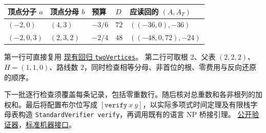 \documentclass[UTF8,fontset=fandol,11pt,a4paper]{ctexart}
\newcommand{\src}[2]{\href{https://github.com/huam54925-cpu/uav-routing-certification/blob/b083efc56ecf5b4f96f2e5b06134d1ed05806351/LeanCompletion/UAV/#1.lean}{#2}}
\begin{document}
\begin{center}
\begin{tabular}{@{}lllll@{}}
\toprule
顶点分子 \(a\) & 顶点分母 \(b\) & 预算 & \(D\) & 应读回的 \((A,A_T)\)\\
\midrule
\((-2,0)\) & \((4,3)\) & \(-3/6\) & \(72\) & \(((-36,0),-36)\)\\
\((-2,0,3)\) & \((2,3,2)\) & \(-2/4\) & \(48\) & \(((-48,0,72),-24)\)\\
\bottomrule
\end{tabular}
\end{center}
第一行可直接复用
\src{TreeBudgetPairedParserExamples}{现有回归 \texttt{twoVertices}}。
第二行可取根 \(2\)、父表 \((2,2,2)\)、\(H=(1,1,0)\)、路线数 \(2\)，同时检查相等分母、非首位的根、零费用与反向还原的顺序。

下一批逐行检查须覆盖每条记录，包括零重数行。随后核对总重数和各非根列的加权和。最后将配置布尔位写成 \([\texttt{verify}\ x\ y]\)，以实际多项式时间定理及有限栈字母表构造 \texttt{StandardVerifier verify}，再调用既有的语言 NP 桥接引理。
\src{TreeBudgetSparseVerifier}{公开验证器}，\src{TreeBudgetSparseNPBridge}{标准机器接口}。
\end{document}
